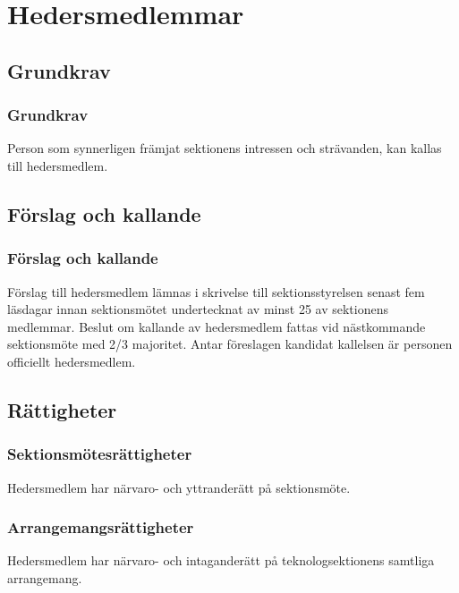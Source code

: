 \section{Hedersmedlemmar}
\label{sec:hedersmedlemmar}

\subsection{Grundkrav}

\subsubsection{Grundkrav}
Person som synnerligen främjat sektionens intressen och strävanden, kan kallas till hedersmedlem.

\subsection{Förslag och kallande}

\subsubsection{Förslag och kallande}
Förslag till hedersmedlem lämnas i skrivelse till sektionsstyrelsen senast fem läsdagar innan sektionsmötet undertecknat av minst 25 av sektionens medlemmar. Beslut om kallande av hedersmedlem fattas vid nästkommande sektionsmöte med 2/3 majoritet. Antar föreslagen kandidat kallelsen är personen officiellt hedersmedlem.

\subsection{Rättigheter}

\subsubsection{Sektionsmötesrättigheter}
Hedersmedlem har närvaro- och yttranderätt på sektionsmöte.

\subsubsection{Arrangemangsrättigheter}
Hedersmedlem har närvaro- och intaganderätt på teknologsektionens samtliga arrangemang.